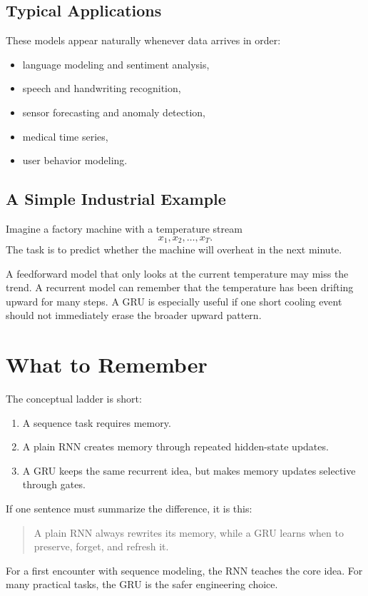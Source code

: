 \documentclass[12pt,a4paper]{article}
\begin{document}
\subsection{Typical Applications}

These models appear naturally whenever data arrives in order:
\begin{itemize}
  \item language modeling and sentiment analysis,
  \item speech and handwriting recognition,
  \item sensor forecasting and anomaly detection,
  \item medical time series,
  \item user behavior modeling.
\end{itemize}

\subsection{A Simple Industrial Example}

Imagine a factory machine with a temperature stream
\[
x_1, x_2, \dots, x_T.
\]
The task is to predict whether the machine will overheat in the next minute.

A feedforward model that only looks at the current temperature may miss the trend. A recurrent model can remember that the temperature has been drifting upward for many steps. A GRU is especially useful if one short cooling event should not immediately erase the broader upward pattern.

\section{What to Remember}

The conceptual ladder is short:
\begin{enumerate}
  \item A sequence task requires memory.
  \item A plain RNN creates memory through repeated hidden-state updates.
  \item A GRU keeps the same recurrent idea, but makes memory updates selective through gates.
\end{enumerate}

If one sentence must summarize the difference, it is this:
\begin{quote}
A plain RNN always rewrites its memory, while a GRU learns when to preserve, forget, and refresh it.
\end{quote}

For a first encounter with sequence modeling, the RNN teaches the core idea. For many practical tasks, the GRU is the safer engineering choice.
\end{document}
